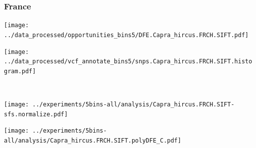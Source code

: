 \subsubsection{France}

\begin{minipage}{0.49\linewidth}
    \texttt{[image: ../data\_processed/opportunities\_bins5/DFE.Capra\_hircus.FRCH.SIFT.pdf]}
\end{minipage}
\begin{minipage}{0.49\linewidth}
    \texttt{[image: ../data\_processed/vcf\_annotate\_bins5/snps.Capra\_hircus.FRCH.SIFT.histogram.pdf]}
\end{minipage}
\\
\begin{minipage}{0.49\linewidth}
    \texttt{[image: ../experiments/5bins-all/analysis/Capra\_hircus.FRCH.SIFT-sfs.normalize.pdf]}
\end{minipage}
\begin{minipage}{0.4\linewidth}
    \texttt{[image: ../experiments/5bins-all/analysis/Capra\_hircus.FRCH.SIFT.polyDFE\_C.pdf]}
\end{minipage}
